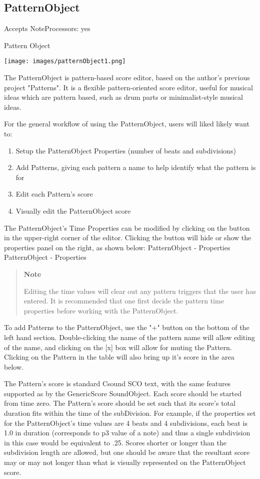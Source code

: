 \subsection{PatternObject}\label{patternObject}

Accepts NoteProcessors: yes

Pattern Object

\texttt{[image: images/patternObject1.png]}

The PatternObject is pattern-based score editor, based on the author's
previous project "Patterns". It is a flexible pattern-oriented score
editor, useful for musical ideas which are pattern based, such as drum
parts or minimalist-style musical ideas.

For the general workflow of using the PatternObject, users will liked
likely want to:

\begin{enumerate}
\def\labelenumi{\arabic{enumi}.}
\item
  Setup the PatternObject Properties (number of beats and subdivisions)
\item
  Add Patterns, giving each pattern a name to help identify what the
  pattern is for
\item
  Edit each Pattern's score
\item
  Visually edit the PatternObject score
\end{enumerate}

The PatternObject's Time Properties can be modified by clicking on the
button in the upper-right corner of the editor. Clicking the button will
hide or show the properties panel on the right, as shown below:
PatternObject - Properties PatternObject - Properties

\begin{quote}
\textbf{Note}

Editing the time values will clear out any pattern triggers that the
user has entered. It is recommended that one first decide the pattern
time properties before working with the PatternObject.
\end{quote}

To add Patterns to the PatternObject, use the "+" button on the bottom
of the left hand section. Double-clicking the name of the pattern name
will allow editing of the name, and clicking on the {[}x{]} box will
allow for muting the Pattern. Clicking on the Pattern in the table will
also bring up it's score in the area below.

The Pattern's score is standard Csound SCO text, with the same features
supported as by the GenericScore SoundObject. Each score should be
started from time zero. The Pattern's score should be set such that its
score's total duration fits within the time of the subDivision. For
example, if the properties set for the PatternObject's time values are 4
beats and 4 subdivisions, each beat is 1.0 in duration (corresponds to
p3 value of a note) and thus a single subdivision in this case would be
equivalent to .25. Scores shorter or longer than the subdivision length
are allowed, but one should be aware that the resultant score may or may
not longer than what is visually represented on the PatternObject score.

